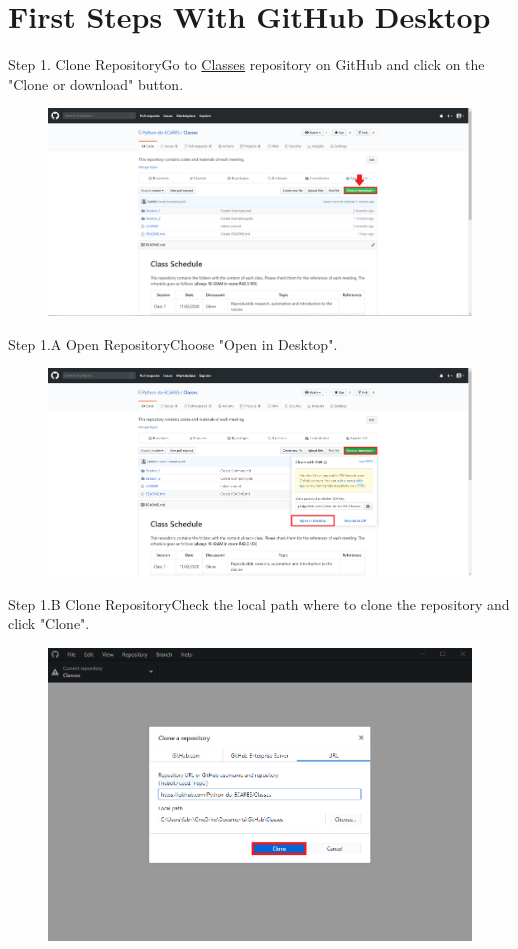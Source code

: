\documentclass[aspectratio=169]{beamer}
\begin{document}
\section{First Steps With GitHub Desktop}

\begin{frame}{Step 1. Clone Repository}{Go to \href{https://github.com/Python-do-ECARES/Classes}{Classes} repository on GitHub and click on the "Clone or download" button.}
\begin{figure}
	\centering
	\includegraphics[width=0.9\linewidth]{../images/step1}
\end{figure}
\end{frame}

\begin{frame}{Step 1.A Open Repository}{Choose "Open in Desktop".}	
	\begin{figure}
		\centering
		\includegraphics[width=0.9\linewidth]{../images/step1.A}
	\end{figure}
\end{frame}

\begin{frame}{Step 1.B Clone Repository}{Check the local path where to clone the repository and click "Clone".}
	\begin{figure}
		\centering
		\includegraphics[width=0.7\linewidth]{../images/step1.B}
	\end{figure}
\end{frame}
\end{document}
